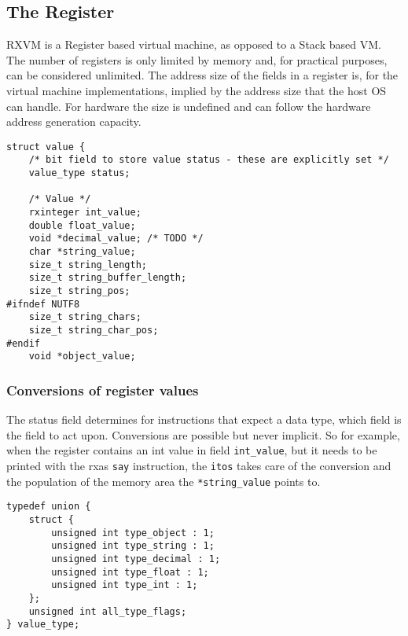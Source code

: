 \documentclass[english,11pt,twoside,toc=bib,toc=idx]{scrreprt}
\newcommand{\crexx}{c\textsc{Rexx}}
\newcommand{\keyword}[1]{\texttt{#1}}
\newcommand{\code}[1]{\texttt{#1}}
\begin{document}
\subsection{The Register}
RXVM is a Register based virtual machine, as opposed to a Stack based
VM. The number of registers is only limited by memory and, for
practical purposes, can be considered unlimited. The address size of
the fields in a register is, for the virtual machine implementations,
implied by the address size that the host OS can handle. For hardware
the size is undefined and can follow the hardware address generation
capacity.

\begin{lstlisting}[style=embed,label=crexxregister,caption={The
\crexx{} Register implementation in C}]
struct value {
    /* bit field to store value status - these are explicitly set */
    value_type status;

    /* Value */
    rxinteger int_value;
    double float_value;
    void *decimal_value; /* TODO */
    char *string_value;
    size_t string_length;
    size_t string_buffer_length;
    size_t string_pos;
#ifndef NUTF8
    size_t string_chars;
    size_t string_char_pos;
#endif
    void *object_value;
\end{lstlisting}

\subsubsection{Conversions of register values}
The status field determines for instructions that expect a data type,
which field is the field to act upon. Conversions are possible but
never implicit. So for example, when the register contains an int
value in field \code{int_value}, but it needs to be printed with the rxas
\keyword{say} instruction, the
\keyword{itos} takes care of the conversion and the population of the
memory area the \code{*string_value} points to. 

\begin{lstlisting}[style=embed,label=crexxregister,caption={Values of
the Status field}]
typedef union {
    struct {
        unsigned int type_object : 1;
        unsigned int type_string : 1;
        unsigned int type_decimal : 1;
        unsigned int type_float : 1;
        unsigned int type_int : 1;
    };
    unsigned int all_type_flags;
} value_type;
\end{lstlisting}
\end{document}
